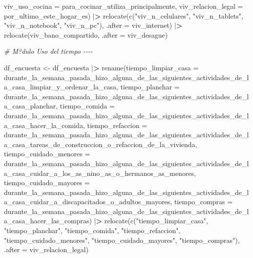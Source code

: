 \documentclass[
]{book}
\newenvironment{Shaded}{\begin{snugshade}}{\end{snugshade}}
\newcommand{\AttributeTok}[1]{\textcolor[rgb]{0.77,0.63,0.00}{#1}}
\newcommand{\CommentTok}[1]{\textcolor[rgb]{0.56,0.35,0.01}{\textit{#1}}}
\newcommand{\ErrorTok}[1]{\textcolor[rgb]{0.64,0.00,0.00}{\textbf{#1}}}
\newcommand{\FunctionTok}[1]{\textcolor[rgb]{0.00,0.00,0.00}{#1}}
\newcommand{\NormalTok}[1]{#1}
\newcommand{\OtherTok}[1]{\textcolor[rgb]{0.56,0.35,0.01}{#1}}
\newcommand{\SpecialCharTok}[1]{\textcolor[rgb]{0.00,0.00,0.00}{#1}}
\newcommand{\StringTok}[1]{\textcolor[rgb]{0.31,0.60,0.02}{#1}}
\theoremstyle{definition}
\theoremstyle{definition}
\theoremstyle{definition}
\theoremstyle{definition}
\theoremstyle{remark}
\begin{document}
\begin{Shaded}
\begin{Highlighting}[]
\AttributeTok{viv\_uso\_cocina =}\NormalTok{ para\_cocinar\_utiliza\_principalmente,}
\AttributeTok{viv\_relacion\_legal =}\NormalTok{ por\_ultimo\_este\_hogar\_es) }\SpecialCharTok{|}\ErrorTok{\textgreater{}}
\FunctionTok{relocate}\NormalTok{(}\FunctionTok{c}\NormalTok{(}\StringTok{"viv\_n\_celulares"}\NormalTok{,}
           \StringTok{"viv\_n\_tablets"}\NormalTok{,}
           \StringTok{"viv\_n\_notebook"}\NormalTok{,}
           \StringTok{"viv\_n\_pc"}\NormalTok{), }\AttributeTok{.after =}\NormalTok{ viv\_internet) }\SpecialCharTok{|}\ErrorTok{\textgreater{}}
\FunctionTok{relocate}\NormalTok{(viv\_bano\_compartido, }\AttributeTok{.after =}\NormalTok{ viv\_desague)}

\CommentTok{\# M?dulo Uso del tiempo {-}{-}{-}{-}}

\NormalTok{df\_encuesta }\OtherTok{\textless{}{-}}\NormalTok{ df\_encuesta }\SpecialCharTok{|}\ErrorTok{\textgreater{}}
\FunctionTok{rename}\NormalTok{(}\AttributeTok{tiempo\_limpiar\_casa =}\NormalTok{ durante\_la\_semana\_pasada\_hizo\_alguna\_de\_las\_siguientes\_actividades\_de\_la\_casa\_limpiar\_y\_ordenar\_la\_casa,}
\AttributeTok{tiempo\_planchar =}\NormalTok{ durante\_la\_semana\_pasada\_hizo\_alguna\_de\_las\_siguientes\_actividades\_de\_la\_casa\_planchar,}
\AttributeTok{tiempo\_comida =}\NormalTok{ durante\_la\_semana\_pasada\_hizo\_alguna\_de\_las\_siguientes\_actividades\_de\_la\_casa\_hacer\_la\_comida,}
\AttributeTok{tiempo\_refaccion =}\NormalTok{ durante\_la\_semana\_pasada\_hizo\_alguna\_de\_las\_siguientes\_actividades\_de\_la\_casa\_tareas\_de\_construccion\_o\_refaccion\_de\_la\_vivienda,}
\AttributeTok{tiempo\_cuidado\_menores =}\NormalTok{ durante\_la\_semana\_pasada\_hizo\_alguna\_de\_las\_siguientes\_actividades\_de\_la\_casa\_cuidar\_a\_los\_as\_nino\_as\_o\_hermanos\_as\_menores,}
\AttributeTok{tiempo\_cuidado\_mayores =}\NormalTok{ durante\_la\_semana\_pasada\_hizo\_alguna\_de\_las\_siguientes\_actividades\_de\_la\_casa\_cuidar\_a\_discapacitados\_o\_adultos\_mayores,}
\AttributeTok{tiempo\_compras =}\NormalTok{ durante\_la\_semana\_pasada\_hizo\_alguna\_de\_las\_siguientes\_actividades\_de\_la\_casa\_hacer\_las\_compras) }\SpecialCharTok{|}\ErrorTok{\textgreater{}}
\FunctionTok{relocate}\NormalTok{(}\FunctionTok{c}\NormalTok{(}\StringTok{"tiempo\_limpiar\_casa"}\NormalTok{,}
           \StringTok{"tiempo\_planchar"}\NormalTok{,}
           \StringTok{"tiempo\_comida"}\NormalTok{,}
           \StringTok{"tiempo\_refaccion"}\NormalTok{,}
           \StringTok{"tiempo\_cuidado\_menores"}\NormalTok{,}
           \StringTok{"tiempo\_cuidado\_mayores"}\NormalTok{,}
           \StringTok{"tiempo\_compras"}\NormalTok{), }\AttributeTok{.after =}\NormalTok{ viv\_relacion\_legal)}


\end{Highlighting}
\end{Shaded}
\end{document}
